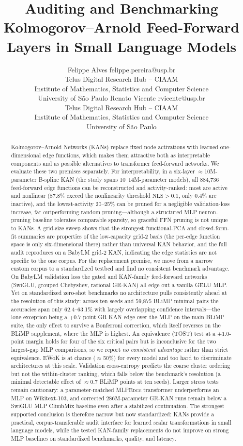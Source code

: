 \documentclass{article}
\title{Auditing and Benchmarking Kolmogorov--Arnold Feed-Forward Layers in Small Language Models}
\author{\name Felippe Alves \email felippe.pereira@usp.br \\
  \addr Telus Digital Research Hub -- CIAAM \\
  Institute of Mathematics, Statistics and Computer Science \\
  University of S\~{a}o Paulo
  \AND
  \name Renato Vicente \email rvicente@usp.br \\
  \addr Telus Digital Research Hub -- CIAAM \\
  Institute of Mathematics, Statistics and Computer Science \\
  University of S\~{a}o Paulo}
\newcommand{\modelname}[1]{\textsc{#1}}
\newcommand{\nls}{\mathrm{NLS}}
\newcommand{\grkan}{\modelname{GR-KAN}}
\newcommand{\mlpedge}{\modelname{MLPEdge}}
\begin{document}
\maketitle

\begin{abstract}
Kolmogorov--Arnold Networks (KANs) replace fixed node activations with learned one-dimensional edge functions, which makes them attractive both as interpretable components and as possible alternatives to transformer feed-forward networks. We evaluate these two premises separately. For interpretability, in a six-layer \(\approx\)10M-parameter B-spline KAN (the study spans 10--14M-parameter models), all 884,736 feed-forward edge functions can be reconstructed and activity-ranked: most are active and nonlinear (87.8\% exceed the nonlinearity threshold \(\nls>0.1\), only 0.4\% are inactive), and the lowest-activity 20--25\% can be pruned for a negligible validation-loss increase, far outperforming random pruning---although a structured MLP neuron-pruning baseline tolerates comparable sparsity, so graceful FFN pruning is not unique to KANs. A grid-size sweep shows that the strongest functional-PCA and closed-form-fit summaries are properties of the low-capacity grid-2 basis (the per-edge function space is only six-dimensional there) rather than universal KAN behavior, and the full audit reproduces on a BabyLM grid-2 KAN, indicating the edge statistics are not specific to the one corpus. For the replacement premise, we move from a narrow custom corpus to a standardized testbed and find no consistent benchmark advantage. On BabyLM validation loss the gated and KAN-family feed-forward networks (SwiGLU, grouped Chebyshev, rational \grkan{}) all edge out a vanilla GELU MLP. Yet on standardized zero-shot benchmarks no architecture pulls consistently ahead at the resolution of this study: across ten seeds and 59,875 BLiMP minimal pairs the accuracies span only 62.4--63.1\% with largely overlapping confidence intervals---the lone exception being a \(+0.7\)-point \grkan{} edge over the MLP on the main BLiMP suite, the only effect to survive a Bonferroni correction, which itself reverses on the BLiMP supplement, where the MLP is highest. An equivalence (TOST) test at a \(\pm1.0\)-point margin holds for four of the six critical pairs but is inconclusive for the two largest-gap MLP comparisons, so we report \emph{no consistent advantage} rather than strict equivalence. EWoK is at chance (\(\approx\)50\%) for every model and too hard to discriminate architectures at this scale. Validation cross-entropy predicts the coarse cluster ordering but not the within-cluster ranking, which falls below the benchmark's resolution (a minimal detectable effect of \(\approx0.7\) BLiMP points at ten seeds). Larger stress tests remain cautionary: a parameter-matched \mlpedge{} transformer underperforms an MLP on Wikitext-103, and corrected 286M-parameter \grkan{} runs remain below a SwiGLU MLP ClimbMix baseline even after a stabilized continuation. The strongest supported conclusion is therefore narrow but now standardized: KANs provide a practical, corpus-transferable audit interface for learned scalar transformations in small language models, while the tested KAN-family replacements do not improve on strong MLP baselines on standardized benchmarks, quality, and latency.

\end{abstract}
\end{document}
